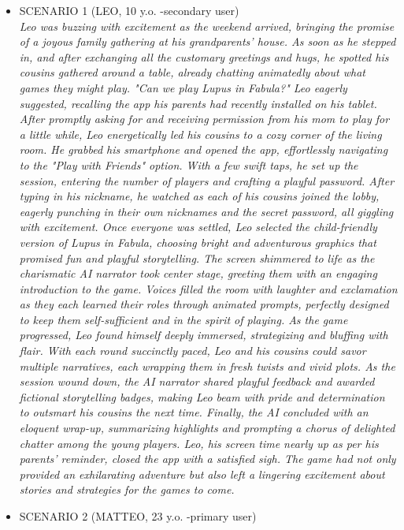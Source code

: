 \documentclass[12pt]{article}
\begin{document}
\begin{itemize}
    \item SCENARIO 1 (LEO, 10 y.o. -secondary user) 
    \\ \textit{Leo was buzzing with excitement as the weekend arrived, bringing the promise of a joyous family gathering at his grandparents’ house. As soon as he stepped in, and after exchanging all the customary greetings and hugs, he spotted his cousins gathered around a table, already chatting animatedly about what games they might play.
    "Can we play Lupus in Fabula?" Leo eagerly suggested, recalling the app his parents had recently installed on his tablet. After promptly asking for and receiving permission from his mom to play for a little while, Leo energetically led his cousins to a cozy corner of the living room.  
    He grabbed his smartphone and opened the app, effortlessly navigating to the "Play with Friends" option. With a few swift taps, he set up the session, entering the number of players and crafting a playful password. After typing in his nickname, he watched as each of his cousins joined the lobby, eagerly punching in their own nicknames and the secret password, all giggling with excitement.  
    Once everyone was settled, Leo selected the child-friendly version of Lupus in Fabula, choosing bright and adventurous graphics that promised fun and playful storytelling. The screen shimmered to life as the charismatic AI narrator took center stage, greeting them with an engaging introduction to the game. Voices filled the room with laughter and exclamation as they each learned their roles through animated prompts, perfectly designed to keep them self-sufficient and in the spirit of playing.  
    As the game progressed, Leo found himself deeply immersed, strategizing and bluffing with flair. With each round succinctly paced, Leo and his cousins could savor multiple narratives, each wrapping them in fresh twists and vivid plots.
    As the session wound down, the AI narrator shared playful feedback and awarded fictional storytelling badges, making Leo beam with pride and determination to outsmart his cousins the next time. Finally, the AI concluded with an eloquent wrap-up, summarizing highlights and prompting a chorus of delighted chatter among the young players.  
    Leo, his screen time nearly up as per his parents’ reminder, closed the app with a satisfied sigh. The game had not only provided an exhilarating adventure but also left a lingering excitement about stories and strategies for the games to come.}
    \item SCENARIO 2 (MATTEO, 23 y.o. -primary user) 

\end{itemize}
\end{document}
